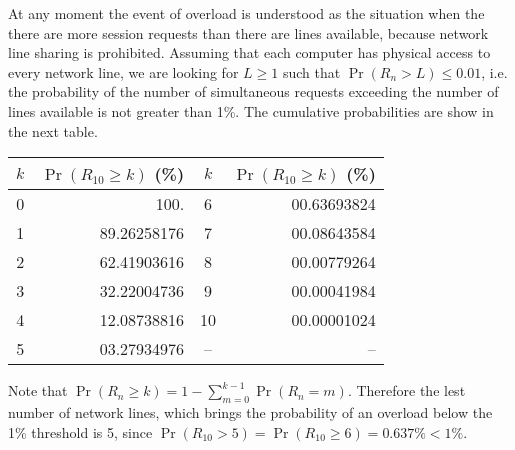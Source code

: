 \documentclass[a4paper]{article}
\newcommand{\brac}[1]{\left ( #1 \right )}
\begin{document}
At any moment the event of overload is understood as the situation when the there are more session requests than there are lines available, because network line sharing is prohibited. Assuming that each computer has physical access to every network line, we are looking for $L\geq 1$ such that $\Pr\brac{R_n>L}\leq 0.01$, i.e. the probability of the number of simultaneous requests exceeding the number of lines available is not greater than 1\%. The cumulative probabilities are show in the next table.
\begin{center}\begin{tabular}{ c | r || c | r }
$k$ & $\Pr\brac{R_{10}\geq k}$ (\%) & $k$ & $\Pr\brac{R_{10}\geq k}$ (\%) \\ \hline\hline
 0 & 100. 			&  6 &  00.63693824 \\ \hline
 1 &  89.26258176 	&  7 &  00.08643584 \\ \hline
 2 &  62.41903616 	&  8 &  00.00779264 \\ \hline
 3 &  32.22004736 	&  9 &  00.00041984 \\ \hline
 4 &  12.08738816 	& 10 &  00.00001024 \\ \hline
 5 &  03.27934976 	& -- & -- \\ \hline
\end{tabular}\end{center}
Note that $\Pr\brac{R_n\geq k} = 1 - \sum_{m=0}^{k-1} \Pr\brac{R_n = m}$. Therefore the lest number of network lines, which brings the probability of an overload below the 1\% threshold is 5, since $\Pr\brac{R_{10}>5} = \Pr\brac{R_{10}\geq 6} = 0.637\% < 1\%$.

\end{document}
